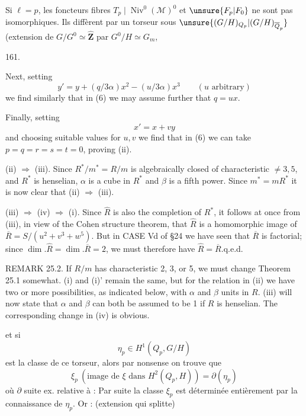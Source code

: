 Si $\ell=p$, les foncteurs fibres $T_p\!\mid\!\operatorname{Niv}^0(\mathcal M)^0$ et $\unsure{F_p|F_0}$ ne sont pas isomorphiques. Ils diffèrent par un torseur sous $\unsure{(G/H)_{Q_p}|(G/H)_{\overline Q_p}}$ (extension de $G/G^0\simeq\widehat{\mathbf Z}$ par $G^0/H\simeq G_m$,

161.

Next, setting
\[
y'=y+(q/3\alpha)x^2-(u/3\alpha)x^3\qquad(u\text{ arbitrary})
\]
we find similarly that in (6) we may assume further that $q=ux$.

Finally, setting
\[
x'=x+vy
\]
and choosing suitable values for $u,v$ we find that in (6) we can take $p=q=r=s=t=0$, proving (ii).

(ii) $\Rightarrow$ (iii). Since $R^*/m^*=R/m$ is algebraically closed of characteristic $\ne3,5$, and $R^*$ is henselian, $\alpha$ is a cube in $R^*$ and $\beta$ is a fifth power. Since $m^*=mR^*$ it is now clear that (ii) $\Rightarrow$ (iii).

(iii) $\Rightarrow$ (iv) $\Rightarrow$ (i). Since $\widehat R$ is also the completion of $R^*$, it follows at once from (iii), in view of the Cohen structure theorem, that $\widehat R$ is a homomorphic image of $\overline R=S/(u^2+v^3+w^5)$. But in CASE Vd of \S24 we have seen that $\overline R$ is factorial; since $\dim.\widehat R=\dim.\overline R=2$, we must therefore have $\widehat R=\overline R$.\qquad q.e.d.

REMARK 25.2. If $R/m$ has characteristic 2, 3, or 5, we must change Theorem 25.1 somewhat. (i) and (i)' remain the same, but for the relation in (ii) we have two or more possibilities, as indicated below, with $\alpha$ and $\beta$ units in $R$. (iii) will now state that $\alpha$ and $\beta$ can both be assumed to be 1 if $R$ is henselian. The corresponding change in (iv) is obvious.

et si
\[
\eta_p\in H^1(Q_p,G/H)
\]
est la classe de ce torseur, alors par  nonsense on trouve que
\[
\xi_p\ (\text{image de }\xi\text{ dans }H^2(Q_p,H))=\partial(\eta_p)
\]
où  $\partial$  suite ex. relative à :
Par suite la classe $\xi_p$ est déterminée entièrement par la connaissance de $\eta_p$. Or :
(extension qui splitte)

